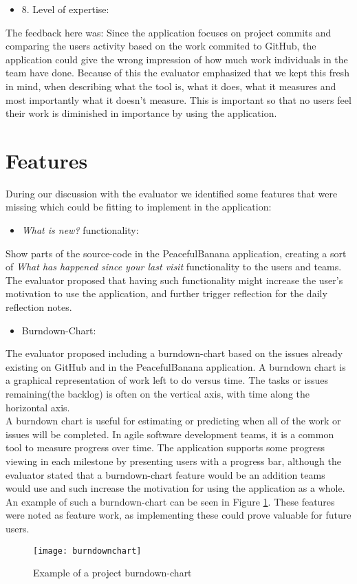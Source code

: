 \begin{itemize}
    \item 8. Level of expertise:   
\end{itemize}
The feedback here was: Since the application focuses on project commits and comparing the users activity based on the work commited to GitHub, the application could give the wrong impression of how much work individuals in the team have done. Because of this the evaluator emphasized that we kept this fresh in mind, when describing what the tool is, what it does, what it measures and most importantly what it doesn't measure. This is important so that no users feel their work is diminished in importance by using the application.

\section{Features}
During our discussion with the evaluator we identified some features that were missing which could be fitting to implement in the application:
\begin{itemize}
	\item \emph{What is new?} functionality:
\end{itemize}
Show parts of the source-code in the PeacefulBanana application, creating a sort of \emph{What has happened since your last visit} functionality to the users and teams. The evaluator proposed that having such functionality might increase the user's motivation to use the application, and further trigger reflection for the daily reflection notes. 
\begin{itemize}
	\item Burndown-Chart:
\end{itemize}
The evaluator proposed including a burndown-chart based on the issues already existing on GitHub and in the PeacefulBanana application. A burndown chart is a graphical representation of work left to do versus time. The tasks or issues remaining(the backlog) is often on the vertical axis, with time along the horizontal axis.\\
A burndown chart is useful for estimating or predicting when all of the work or issues will be completed. In agile software development teams, it is a common tool to measure progress over time. The application supports some progress viewing in each milestone by presenting users with a progress bar, although the evaluator stated that a burndown-chart feature would be an addition teams would use and such increase the motivation for using the application as a whole. An example of such a burndown-chart can be seen in Figure \ref{burndownchart}. 
These features were noted as feature work, as implementing these could prove valuable for future users. 
\begin{figure}[h!]
    \centering
        \texttt{[image: burndownchart]}
    \caption{Example of a project burndown-chart}
    \label{burndownchart}
\end{figure}
